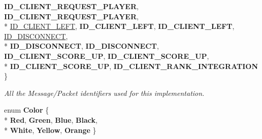 \begin{DoxyCompactItemize}
{\bfseries I\-D\-\_\-\-C\-L\-I\-E\-N\-T\-\_\-\-R\-E\-Q\-U\-E\-S\-T\-\_\-\-P\-L\-A\-Y\-E\-R}, 
{\bfseries I\-D\-\_\-\-C\-L\-I\-E\-N\-T\-\_\-\-R\-E\-Q\-U\-E\-S\-T\-\_\-\-P\-L\-A\-Y\-E\-R}, 
\\*
\hyperlink{namespace_champ_net_plugin_a2ade5cfa7cf6c25ab7236c6b54a57821a170a6a655b34086567c4039a8e9ba81d}{I\-D\-\_\-\-C\-L\-I\-E\-N\-T\-\_\-\-L\-E\-F\-T}, 
{\bfseries I\-D\-\_\-\-C\-L\-I\-E\-N\-T\-\_\-\-L\-E\-F\-T}, 
{\bfseries I\-D\-\_\-\-C\-L\-I\-E\-N\-T\-\_\-\-L\-E\-F\-T}, 
\hyperlink{namespace_champ_net_plugin_a2ade5cfa7cf6c25ab7236c6b54a57821ab64ca706dd3c8029ea9dc9a239237e15}{I\-D\-\_\-\-D\-I\-S\-C\-O\-N\-N\-E\-C\-T}, 
\\*
{\bfseries I\-D\-\_\-\-D\-I\-S\-C\-O\-N\-N\-E\-C\-T}, 
{\bfseries I\-D\-\_\-\-D\-I\-S\-C\-O\-N\-N\-E\-C\-T}, 
{\bfseries I\-D\-\_\-\-C\-L\-I\-E\-N\-T\-\_\-\-S\-C\-O\-R\-E\-\_\-\-U\-P}, 
{\bfseries I\-D\-\_\-\-C\-L\-I\-E\-N\-T\-\_\-\-S\-C\-O\-R\-E\-\_\-\-U\-P}, 
\\*
{\bfseries I\-D\-\_\-\-C\-L\-I\-E\-N\-T\-\_\-\-S\-C\-O\-R\-E\-\_\-\-U\-P}, 
{\bfseries I\-D\-\_\-\-C\-L\-I\-E\-N\-T\-\_\-\-R\-A\-N\-K\-\_\-\-I\-N\-T\-E\-G\-R\-A\-T\-I\-O\-N}
 \}
\begin{DoxyCompactList}\small\item\em All the Message/\-Packet identifiers used for this implementation. \end{DoxyCompactList}\item 
enum {\bfseries Color} \{ \\*
{\bfseries Red}, 
{\bfseries Green}, 
{\bfseries Blue}, 
{\bfseries Black}, 
\\*
{\bfseries White}, 
{\bfseries Yellow}, 
{\bfseries Orange}
 \}
\end{DoxyCompactItemize}
